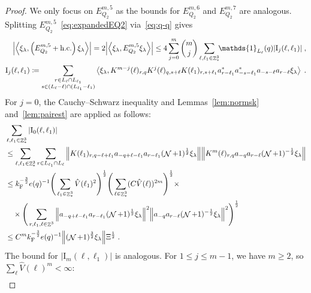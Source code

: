 \documentclass[12pt,a4paper]{article}
\numberwithin{equation}{section}
\newcommand{\1}{\mathbb{I}}
\newcommand{\F}{\mathrm{F}}
\newcommand{\I}{\mathrm{I}}
\DeclareMathOperator{\Z}{\mathbb{Z}}
\DeclareMathOperator{\NN}{\mathcal{N}}
\newcommand{\half}{\frac{1}{2}}
\newcommand{\eva}[1]{\left\langle #1 \right\rangle}
\theoremstyle{plain}
\theoremstyle{definition}
\theoremstyle{remark}
\theoremstyle{plain}
\theoremstyle{definition}
\theoremstyle{remark}
\begin{document}
\begin{proof}
We only focus on $ E^{m,5}_{Q_2} $ as the bounds for $ E^{m,6}_{Q_2} $ and $ E^{m,7}_{Q_2} $ are analogous. Splitting $ E^{m,5}_{Q_2} $~\eqref{eq:expandedEQ2} via~\eqref{eq:q-q} gives
\begin{equation} \label{eq:EQ2131}
\begin{aligned}
	\abs{\eva{\xi_\lambda,\left(E^{m,5}_{Q_2}+\mathrm{h.c.}\right) \xi_\lambda }} 
	= 2\abs{\eva{\xi_\lambda, E^{m,5}_{Q_2} \xi_\lambda }}
	\le 4 \sum_{j=0}^m {{m}\choose j} \sum\limits_{\ell,\ell_1  \in \Z^3_*}\!\! \mathds{1}_{L_\ell}(q) |\I_j(\ell, \ell_1)| \;,\\
	\I_j(\ell, \ell_1)
	\coloneq \sum\limits_{\substack{r\in L_{\ell} \cap L_{\ell_1}\\ s \in (L_{\ell} - \ell) \cap (L_{\ell_1} - \ell_1)}}
		\eva{\xi_\lambda, K^{m-j}(\ell)_{r,q} K^{j}(\ell)_{q,s+\ell} K(\ell_1)_{r,s+\ell_1} a^*_{r-\ell_1} a^*_{-s-\ell_1} a_{-s-\ell} a_{r-\ell} \xi_\lambda} \;. \\
\end{aligned}
\end{equation}
For $ j = 0 $, the Cauchy--Schwarz inequality and Lemmas~\ref{lem:normsk} and~\ref{lem:pairest} are applied as follows:
\textcolor{green!30!black}{
\begin{align}
	&\sum_{\ell,\ell_1 \in \Z^3_*} |\I_0(\ell, \ell_1)| \nonumber\\
	&\leq \sum_{\ell,\ell_1 \in \Z^3_*} \sum\limits_{r\in L_{\ell_1} \cap L_\ell} \norm{ K(\ell_1)_{r,q-\ell+\ell_1} a_{-q+\ell-\ell_1} a_{r-\ell_1} (\NN+1)^{\half} \xi_\lambda} 
		\norm{ K^m(\ell)_{r,q} a_{-q}a_{r-\ell} (\NN+1)^{-\half} \xi_\lambda } \nonumber\\
	&\leq k_{\F}^{-\frac 32} e(q)^{-1}
		\Bigg( \sum_{\ell_1 \in \Z^3_*} \hat{V}(\ell_1)^2 \Bigg)^{\half}
		\Bigg( \sum_{\ell \in \Z^3_*} (C \hat{V}(\ell))^{2m} \Bigg)^{\half} \times \nonumber\\
	&\quad \times \Bigg( \sum\limits_{r,\ell_1,\ell \in \Z^3} \norm{ a_{-q+\ell-\ell_1} a_{r-\ell_1}(\NN+1)^{\half} \xi_\lambda}^2
		\norm{ a_{-q} a_{r-\ell} (\NN+1)^{-\half} \xi_\lambda }^2 \Bigg)^{\half} \nonumber\\
	&\leq C^m k_{\F}^{-\frac 32} e(q)^{-1}
		\norm{ (\NN+1)^{\frac 32} \xi_\lambda} \Xi^{\half} \;. \label{eq:estEQ2131}
\end{align}
}
The bound for $ |\I_m(\ell, \ell_1)| $ is analogous. For $ 1 \le j \le m-1 $, we have $ m \ge 2 $, so $ \sum_\ell \hat{V}(\ell)^m < \infty $:
\textcolor{green!30!black}{
\begin{align}

\end{align}}
\end{proof}
\end{document}
